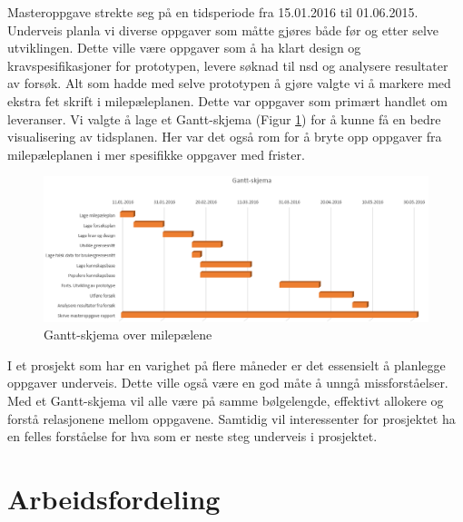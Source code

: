 Masteroppgave strekte seg på en tidsperiode fra 15.01.2016 til 01.06.2015. Underveis planla vi diverse oppgaver som måtte gjøres både før og etter selve utviklingen. Dette ville være oppgaver som å ha klart design og kravspesifikasjoner for prototypen, levere søknad til \gls{nsd} og analysere resultater av forsøk.
Alt som hadde med selve prototypen å gjøre valgte vi å markere med ekstra fet skrift i milepæleplanen. Dette var oppgaver som primært handlet om leveranser.  Vi valgte å lage et Gantt-skjema (Figur \ref{fig:ganttdiagram}) for å kunne få en bedre visualisering av tidsplanen. Her var det også rom for å bryte opp oppgaver fra milepæleplanen i mer spesifikke oppgaver med frister.
\begin{figure}[H]
\begin{center}
\includegraphics[width=16cm]{images/milep-gant-diagram}
\caption{Gantt-skjema over milepælene}
\label{fig:ganttdiagram}
\end{center}
\end{figure}
I et prosjekt som har en varighet på flere måneder er det essensielt å planlegge oppgaver underveis. Dette ville også være en god måte å unngå missforståelser. Med et Gantt-skjema vil alle være på samme bølgelengde, effektivt allokere og forstå relasjonene mellom oppgavene. Samtidig vil interessenter for prosjektet ha en felles forståelse for hva som er neste steg underveis i prosjektet.
\section{Arbeidsfordeling}

